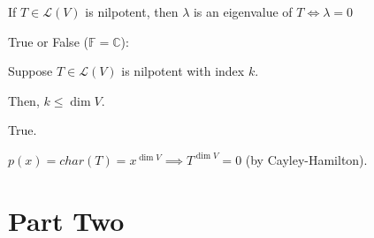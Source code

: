 \documentclass[11pt,fleqn]{book} %
\begin{document}
 If $T \in \mathcal{L}(V)$ is nilpotent, then $\lambda$ is an eigenvalue of $T \iff \lambda = 0$

\begin{example}
    True or False ($\mathbb{F} = \mathbb{C}$):

    Suppose $T \in \mathcal{L}(V)$ is nilpotent with index $k$.

    Then, $k \le \dim V$.

    {\color{lightblue} True.

    $p(x) = char(T) = x^{\dim V} \implies T^{\dim V} = 0$ (by Cayley-Hamilton). }
\end{example}


\part{Part Two}





\end{document}
